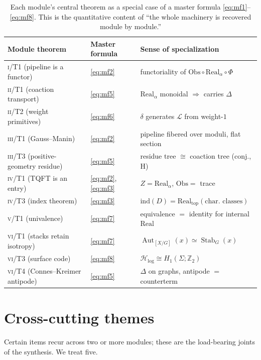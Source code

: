 \documentclass[12pt]{article}
\theoremstyle{definition}
\theoremstyle{remark}
\newcommand{\Real}{\mathrm{Real}}
\newcommand{\Obs}{\mathrm{Obs}}
\newcommand{\Aut}{\operatorname{Aut}}
\newcommand{\Stab}{\operatorname{Stab}}
\newcommand{\Hstat}{\textsf{H}}
\newcommand{\Ho}{\mathcal{H}}
\newcommand{\Hlog}{\Ho_{\mathrm{log}}}
\newcommand{\Lcoalg}{\mathcal{L}}
\newcommand{\ZZ}{\mathbb{Z}}
\newcommand{\PI}{\textsc{i}}
\newcommand{\PII}{\textsc{ii}}
\newcommand{\PIII}{\textsc{iii}}
\newcommand{\PIV}{\textsc{iv}}
\newcommand{\PV}{\textsc{v}}
\newcommand{\PVI}{\textsc{vi}}
\begin{document}
\begin{table}[t]
\centering
\renewcommand{\arraystretch}{1.3}
\small
\begin{tabular}{@{}llp{}@{}}
\toprule
Module theorem & Master formula & Sense of specialization \\
\midrule
\PI/T1 (pipeline is a functor) & \eqref{eq:mf2} & functoriality of $\Obs\circ\Real_\alpha\circ\Phi$ \\
\PII/T1 (coaction transport) & \eqref{eq:mf5} & $\Real_\alpha$ monoidal $\Rightarrow$ carries $\Delta$ \\
\PII/T2 (weight primitives) & \eqref{eq:mf6} & $\delta$ generates $\Lcoalg$ from weight-$1$ \\
\PIII/T1 (Gauss--Manin) & \eqref{eq:mf2} & pipeline fibered over moduli, flat section \\
\PIII/T3 (positive-geometry residue) & \eqref{eq:mf5} & residue tree $\cong$ coaction tree (conj., \Hstat) \\
\PIV/T1 (TQFT is an entry) & \eqref{eq:mf2},\eqref{eq:mf3} & $Z=\Real_\alpha$, $\Obs=$ trace \\
\PIV/T3 (index theorem) & \eqref{eq:mf3} & $\mathrm{ind}(D)=\Real_{\text{top}}(\text{char.\ classes})$ \\
\PV/T1 (univalence) & \eqref{eq:mf7} & equivalence $=$ identity for internal $\Real$ \\
\PVI/T1 (stacks retain isotropy) & \eqref{eq:mf7} & $\Aut_{[X/G]}(x)\simeq\Stab_G(x)$ \\
\PVI/T3 (surface code) & \eqref{eq:mf8} & $\Hlog\cong H_1(\Sigma;\ZZ_2)$ \\
\PVI/T4 (Connes--Kreimer antipode) & \eqref{eq:mf5} & $\Delta$ on graphs, antipode $=$ counterterm \\
\bottomrule
\end{tabular}
\caption{Each module's central theorem as a special case of a master formula
\eqref{eq:mf1}--\eqref{eq:mf8}.  This is the quantitative content of ``the whole
machinery is recovered module by module.''}
\label{tab:masterrec}
\end{table}

\section{Cross-cutting themes}
\label{sec:crosscut}

Certain items recur across two or more modules; these are the load-bearing joints of
the synthesis.  We treat five.
\end{document}
